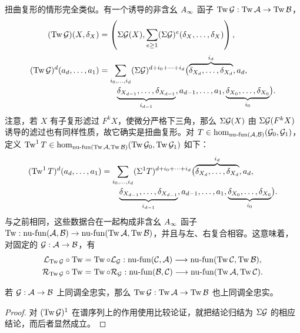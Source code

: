扭曲复形的情形完全类似。有一个诱导的非含幺 $\Ai$ 函子 $\Tw\G:\Tw\A\to\Tw\B$，
\[
\begin{aligned}
(\Tw\G)(X,\delta_X)&=\left(\Sigma\G(X),\sum_{e\geq1}(\Sigma\G)^e(\delta_X,\ldots,\delta_X)\right),\\[2pt]
(\Tw\G)^d(a_d,\ldots,a_1)
&=\sum_{i_0,\ldots,i_d}(\Sigma\G)^{d+i_0+\cdots+i_d}\bigl(\overbrace{\delta_{X_d},\ldots,\delta_{X_d}}^{i_d},a_d,\\[-2pt]
&\qquad\underbrace{\delta_{X_{d-1}},\ldots,\delta_{X_{d-1}}}_{i_{d-1}},a_{d-1},\ldots,a_1,\underbrace{\delta_{X_0},\ldots,\delta_{X_0}}_{i_0}\bigr).
\end{aligned}
\]
注意，若 $X$ 有子复形滤过 $F^kX$，使微分严格下三角，那么 $\Sigma\G(X)$ 由 $\Sigma\G(F^kX)$ 诱导的滤过也有同样性质，故它确实是扭曲复形。对 $T\in\hom_{\nufun(\A,\B)}(\G_0,\G_1)$，定义 $\Tw^1T\in\hom_{\nufun(\Tw\A,\Tw\B)}(\Tw\G_0,\Tw\G_1)$ 如下：
\begin{equation}\label{eq:3.24}
\begin{aligned}
(\Tw^1T)^d(a_d,\ldots,a_1)
&=\sum_{i_0,\ldots,i_d}(\Sigma^1T)^{d+i_0+\cdots+i_d}\bigl(\overbrace{\delta_{X_d},\ldots,\delta_{X_d}}^{i_d},a_d,\\[-2pt]
&\qquad\underbrace{\delta_{X_{d-1}},\ldots,\delta_{X_{d-1}}}_{i_{d-1}},a_{d-1},\ldots,a_1,\underbrace{\delta_{X_0},\ldots,\delta_{X_0}}_{i_0}\bigr).
\end{aligned}
\end{equation}
与之前相同，这些数据合在一起构成非含幺 $\Ai$ 函子 $\Tw:\nufun(\A,\B)\to\nufun(\Tw\A,\Tw\B)$，并且与左、右复合相容。这意味着，对固定的 $\G:\A\to\B$，有
\begin{equation}\label{eq:3.25}
\begin{aligned}
\LG_{\Tw\G}\circ\Tw&=\Tw\circ\LG_{\G}:\nufun(\C,\A)\longrightarrow\nufun(\Tw\C,\Tw\B),\\
\RG_{\Tw\G}\circ\Tw&=\Tw\circ\RG_{\G}:\nufun(\B,\C)\longrightarrow\nufun(\Tw\A,\Tw\C).
\end{aligned}
\end{equation}

\begin{lemma}\label{st:3.23}
若 $\G:\A\to\B$ 上同调全忠实，那么 $\Tw\G:\Tw\A\to\Tw\B$ 也上同调全忠实。
\end{lemma}
\begin{proof}
对 $(\Tw\G)^1$ 在谱序列上的作用使用比较论证，就把结论归结为 $\Sigma\G$ 的相应结论，而后者显然成立。
\end{proof}

